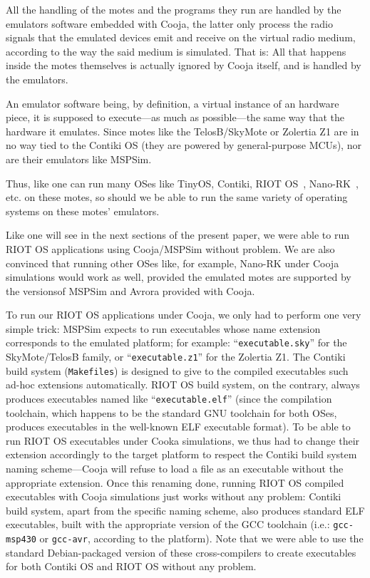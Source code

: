 \documentclass[10pt,emptycopyrightspace]{ewsn-proc}
\begin{document}
All the handling of the motes and the programs they run are handled by
the emulators software embedded with Cooja, the latter only process the
radio signals that the emulated devices emit and receive on the virtual
radio medium, according to the way the said medium is simulated.
That is: All that happens inside the motes themselves is actually
ignored by Cooja itself, and is handled by the emulators.

An emulator software being, by definition, a virtual instance of an
hardware piece, it is supposed to execute---as much as possible---the
same way that the hardware it emulates. Since motes like the TelosB/SkyMote
or Zolertia Z1 are in no way tied to the Contiki OS (they are powered
by general-purpose MCUs), nor are their emulators like MSPSim.

Thus, like one can run many OSes like TinyOS, Contiki, RIOT OS~\cite{RIOT},
Nano-RK~\cite{NanoRK}, etc. on these motes, so should we be able to run
the same variety of operating systems on these motes' emulators.

Like one will see in the next sections of the present paper, we were
able to run RIOT OS applications using Cooja/MSPSim without problem.
We are also convinced that running other OSes like, for example,
Nano-RK under Cooja simulations would work as well, provided
the emulated motes are supported by the versionsof MSPSim
and Avrora provided with Cooja.

\smallskip

To run our RIOT OS applications under Cooja, we only had to perform one
very simple trick: MSPSim expects to run executables whose name extension
corresponds to the emulated platform; for example:
``\texttt{executable.sky}'' for the SkyMote/TelosB family, or
``\texttt{executable.z1}'' for the Zolertia Z1. The Contiki build system
(\texttt{Makefiles}) is designed to give to the compiled executables
such ad-hoc extensions automatically. RIOT OS build system, on the
contrary, always produces executables named like ``\texttt{executable.elf}''
(since the compilation toolchain, which happens to be the standard GNU
toolchain for both OSes, produces executables in the well-known ELF
executable format). To be able to run RIOT OS executables under Cooka
simulations, we thus had to change their extension accordingly to the
target platform to respect the Contiki build system naming scheme---Cooja
will refuse to load a file as an executable without the appropriate
extension. Once this renaming done, running RIOT OS compiled executables
with Cooja simulations just works without any problem: Contiki build
system, apart from the specific naming scheme, also produces standard
ELF executables, built with the appropriate version of the GCC toolchain
(i.e.: \texttt{gcc-msp430} or \texttt{gcc-avr}, according to the platform).
Note that we were able to use the standard Debian-packaged version of
these cross-compilers to create executables for both Contiki OS and
RIOT OS without any problem.
\end{document}
